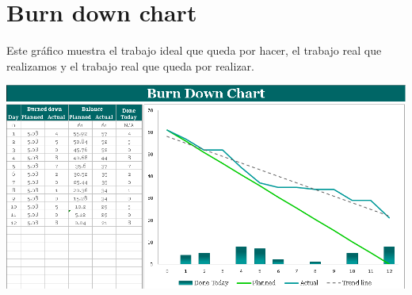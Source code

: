 \chapter{Burn down chart}

Este gráfico muestra el trabajo ideal que queda por hacer, el trabajo real que realizamos y el trabajo real que queda por realizar. 

\begin{table}[htbp]
	 
\end{table}

\centering
\includegraphics[width=1.20\textwidth]{img/BurnDownChart}\par\vspace{1cm}
\vspace{0.30cm}	
